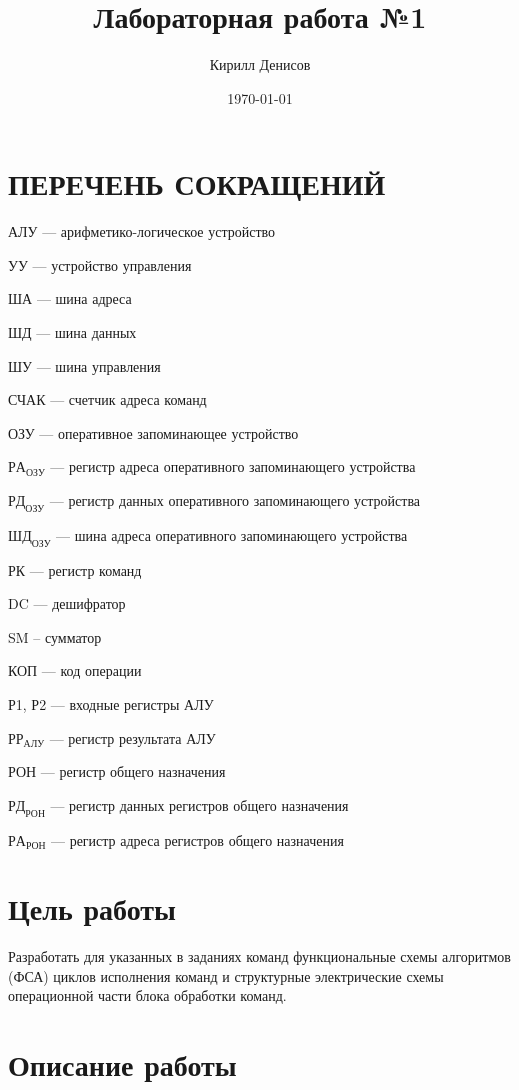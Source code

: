 \documentclass[a4paper,14pt]{extarticle}
\author{Кирилл Денисов}
\title{Лабораторная работа №1}
\date{\today}
\newcommand{\pathToCommonFolder}{/home/denilai/Documents/repos/latex/Common}
\def\myformat#1{\hfil #1\hfil}
\begin{document}
%	
\setcounter{page}{2}
	
	\section*{\myformat{ПЕРЕЧЕНЬ СОКРАЩЕНИЙ}}	
	АЛУ --- арифметико-логическое устройство
	
	УУ --- устройство управления
	
	ША --- шина адреса
	
	ШД --- шина данных
	
	ШУ --- шина управления
	
	СЧАК --- счетчик адреса команд
	
	ОЗУ  --- оперативное запоминающее устройство
	
	$РА_{ОЗУ}$ --- регистр адреса оперативного запоминающего устройства
	
	$РД_{ОЗУ}$ --- регистр данных оперативного запоминающего устройства
	
	$ШД_{ОЗУ}$ --- шина адреса оперативного запоминающего устройства
	
	РК  --- регистр команд
	
	
	DC  --- дешифратор
	
	SM -- сумматор
	
	КОП --- код операции
	
	Р1, Р2 --- входные регистры АЛУ
	
	$РР_{АЛУ}$ --- регистр результата АЛУ
	
	РОН --- регистр общего назначения
	
	
	$РД_{РОН}$  --- регистр данных регистров общего назначения
	
	$РА_{РОН}$  --- регистр адреса регистров общего назначения
	
	\newpage
	
\section*{Цель работы}
Разработать для указанных в заданиях команд функциональные схемы
алгоритмов
(ФСА)
циклов
исполнения
команд
и
структурные
электрические схемы операционной части блока обработки команд.
\section*{Описание работы}
\end{document}
